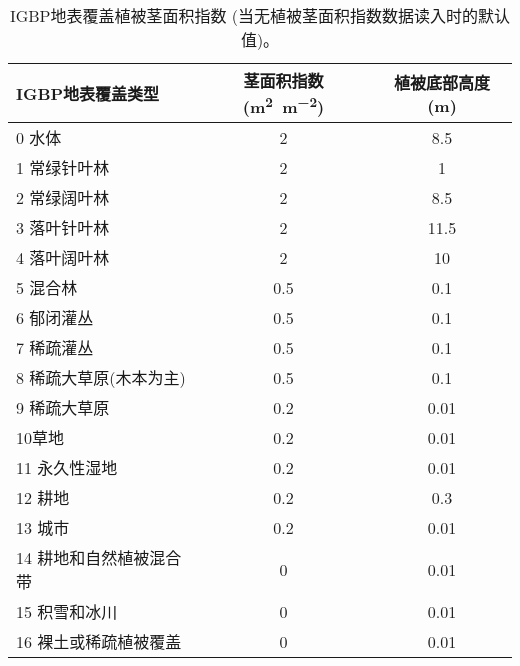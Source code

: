 \begin{table}[]
    \centering
    \caption{IGBP地表覆盖植被茎面积指数 (当无植被茎面积指数数据读入时的默认值)。}
    \label{tab:IGBP地表覆盖植被茎面积指数}
\begin{tabular}{@{}lcc@{}}
\toprule
IGBP地表覆盖类型    & 茎面积指数 (\unit{m^2.m^{-2}}) & 植被底部高度 (m) \\ \midrule
0 水体          & 2                   & 8.5                 \\
1 常绿针叶林       & 2                   & 1                   \\
2 常绿阔叶林       & 2                   & 8.5                 \\
3 落叶针叶林       & 2                   & 11.5                \\
4 落叶阔叶林       & 2                   & 10                  \\
5 混合林         & 0.5                 & 0.1                 \\
6 郁闭灌丛        & 0.5                 & 0.1                 \\
7 稀疏灌丛        & 0.5                 & 0.1                 \\
8 稀疏大草原(木本为主) & 0.5                 & 0.1                 \\
9 稀疏大草原       & 0.2                 & 0.01                \\
10草地          & 0.2                 & 0.01                \\
11 永久性湿地      & 0.2                 & 0.01                \\
12 耕地         & 0.2                 & 0.3                 \\
13 城市         & 0.2                 & 0.01                \\
14 耕地和自然植被混合带 & 0                   & 0.01                \\
15 积雪和冰川      & 0                   & 0.01                \\
16 裸土或稀疏植被覆盖  & 0                   & 0.01                \\ \bottomrule
\end{tabular}
\end{table}

